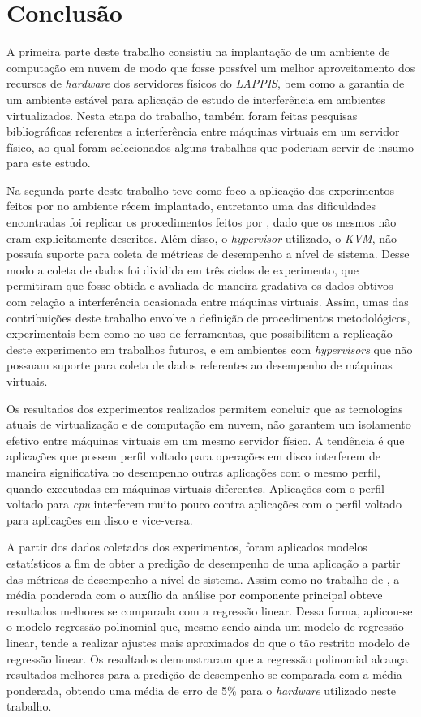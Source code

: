 \chapter{Conclusão}
\label{cap:conclusao}

A primeira parte deste trabalho consistiu na implantação de um ambiente de computação em nuvem de modo que fosse possível um melhor aproveitamento dos recursos de \textit{hardware} dos servidores físicos do \textit{LAPPIS}, bem como a garantia de um ambiente estável para aplicação de estudo de interferência em ambientes virtualizados. Nesta etapa do trabalho, também foram feitas pesquisas bibliográficas referentes a interferência entre máquinas virtuais em um servidor físico, ao qual foram selecionados alguns trabalhos que poderiam servir de insumo para este estudo.

Na segunda parte deste trabalho teve como foco a aplicação dos experimentos feitos por  no ambiente récem implantado, entretanto uma das dificuldades encontradas foi replicar os procedimentos feitos por , dado que os mesmos não eram explicitamente descritos. Além disso, o \textit{hypervisor} utilizado, o \textit{KVM}, não possuía suporte para coleta de métricas de desempenho a nível de sistema. Desse modo a coleta de dados foi dividida em três ciclos de experimento, que permitiram que fosse obtida e avaliada de maneira gradativa os dados obtivos com relação a interferência ocasionada entre máquinas virtuais. Assim, umas das contribuições deste trabalho envolve a definição de procedimentos metodológicos, experimentais bem como no uso de ferramentas, que possibilitem a replicação deste experimento em trabalhos futuros, e em ambientes com \textit{hypervisors} que não possuam suporte para coleta de dados referentes ao desempenho de máquinas virtuais.  %

Os resultados dos experimentos realizados permitem concluir que as tecnologias atuais de virtualização e de computação em nuvem, não garantem um isolamento efetivo entre máquinas virtuais em um mesmo servidor físico. A tendência é que aplicações que possem perfil voltado para operações em disco interferem de maneira significativa no desempenho outras aplicações  com o mesmo perfil, quando executadas em máquinas virtuais diferentes. Aplicações com o perfil voltado para \textit{cpu} interferem muito pouco contra aplicações com o perfil voltado para aplicações em disco e vice-versa.

A partir dos dados coletados dos experimentos, foram aplicados modelos estatísticos a fim de obter a predição de desempenho de uma aplicação a partir das métricas de desempenho a nível de sistema. Assim como no trabalho de , a média ponderada com o auxílio da análise por componente principal obteve resultados melhores se comparada com a regressão linear. Dessa forma, aplicou-se o modelo regressão polinomial que, mesmo sendo ainda um modelo de regressão linear, tende a realizar ajustes mais aproximados do que o tão restrito modelo de regressão linear. Os resultados demonstraram que a regressão polinomial alcança resultados melhores para a predição de desempenho se comparada com a média ponderada, obtendo uma média de erro de 5\% para o \textit{hardware} utilizado neste trabalho.

